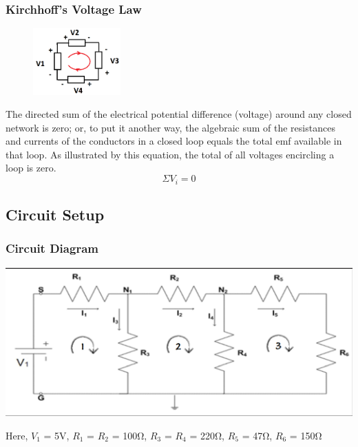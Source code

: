 \documentclass{article}
\begin{document}
\subsubsection{Kirchhoff's Voltage Law}
\begin{figure}
\includegraphics[width=0.3\textwidth]{pic2.png}
\end{figure}
The directed sum of the electrical potential difference (voltage) around any closed network is zero; or, to put it another way, the algebraic sum of the resistances and currents of the conductors in a closed loop equals the total emf available in that loop. As illustrated by this equation, the total of all voltages encircling a loop is zero.
\begin{equation}
    \Sigma V_{i} = 0
\end{equation}
\newpage
\subsection{Circuit Setup}
\subsubsection{Circuit Diagram}
\begin{center}
\includegraphics[width=1\textwidth]{pic3.png}    
\end{center}
Here, $V_1$ = 5V, $R_1$ = $R_2$ = 100\si{\ohm}, $R_3$ = $R_4$ = 220\si{\ohm}, $R_5$ = 47\si{\ohm}, $R_6$ = 150\si{\ohm}
\end{document}
